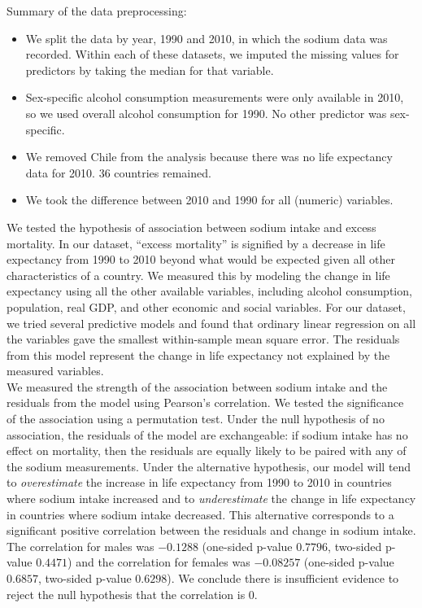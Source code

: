 \documentclass{article}
\begin{document}
\let\thefootnote\relax{}

Summary of the data preprocessing:
\begin{itemize}
\item We split the data by year, 1990 and 2010, in which the sodium data was recorded. Within each of these datasets, we imputed the missing values for predictors by taking the median for that variable.
\item Sex-specific alcohol consumption measurements were only available in 2010, so we used overall alcohol consumption for 1990. No other predictor was sex-specific. 
\item We removed Chile from the analysis because there was no life expectancy data for 2010. 36 countries remained.
\item	We took the difference between 2010 and 1990 for all (numeric) variables.
\end{itemize}

We tested the hypothesis of association between sodium intake and excess mortality.  In our dataset, ``excess mortality'' is signified by a decrease in life expectancy from 1990 to 2010 beyond what would be expected given all other characteristics of a country.  We measured this by modeling the change in life expectancy using all the other available variables, including alcohol consumption, population, real GDP, and other economic and social variables.  For our dataset, we tried several predictive models and found that ordinary linear regression on all the variables gave the smallest within-sample mean square error.  The residuals from this model represent the change in life expectancy not explained by the measured variables. \\

We measured the strength of the association between sodium intake and the residuals from the model using Pearson's correlation. We tested the significance of the association using a permutation test.  Under the null hypothesis of no association, the residuals of the model are exchangeable: if sodium intake has no effect on mortality, then the residuals are equally likely to be paired with any of the sodium measurements.  Under the alternative hypothesis, our model will tend to \textit{overestimate} the increase in life expectancy from 1990 to 2010 in countries where sodium intake increased and to \textit{underestimate} the change in life expectancy in countries where sodium intake decreased. This alternative corresponds to a significant positive correlation between the residuals and change in sodium intake.  The correlation for males was $-0.1288$ (one-sided p-value $0.7796$, two-sided p-value $0.4471$) and the correlation for females was $-0.08257$ (one-sided p-value $0.6857$, two-sided p-value $0.6298$). We conclude there is insufficient evidence to reject the null hypothesis that the correlation is $0$. \\
\end{document}
